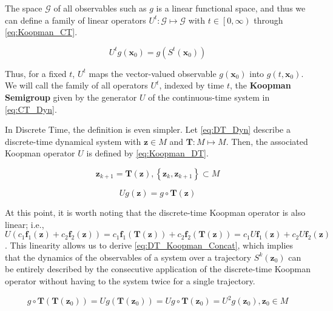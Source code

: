 \documentclass{article}
\begin{document}
    The space $\mathcal{G}$ of all observables such as $g$ is a linear functional space, and thus we can define a family of linear operators $U^t:\mathcal{G} \mapsto \mathcal{G}$ with $t \in \left[0,\infty\right)$ through \cref{eq:Koopman_CT}.

    \begin{equation} \label{eq:Koopman_CT}
        U^t g\left(\mathbf{x}_0\right) = g \left(S^t \left(\mathbf{x}_0\right)\right)
    \end{equation}

    Thus, for a fixed $t$, $U^t$ maps the vector-valued observable $g(\mathbf{x}_0)$ into $g\left(t,\mathbf{x}_0\right)$. We will call the family of all operators $U^t$, indexed by time $t$, the \textbf{Koopman Semigroup} given by the generator $U$ of the continuous-time system in \cref{eq:CT_Dyn}.

    In Discrete Time, the definition is even simpler. Let \cref{eq:DT_Dyn} describe a discrete-time dynamical system with $\mathbf{z} \in M$ and $\mathbf{T}:M \mapsto M$. Then, the associated Koopman operator $U$ is defined by \cref{eq:Koopman_DT}.

    \begin{equation} \label{eq:DT_Dyn}
        \mathbf{z}_{k+1} = \mathbf{T}\left(\mathbf{z}\right) , \left\{\mathbf{z}_k,\mathbf{z}_{k+1}\right\} \subset M
    \end{equation}

    \begin{equation} \label{eq:Koopman_DT}
        U g\left(\mathbf{z}\right) = g \circ \mathbf{T} \left(\mathbf{z}\right)
    \end{equation}

    At this point, it is worth noting that the discrete-time Koopman operator is also linear; i.e., $U\left(c_1 \mathbf{f}_1\left(\mathbf{z}\right) + c_2 \mathbf{f}_2\left(\mathbf{z}\right)\right) =
    c_1 \mathbf{f}_1\left(\mathbf{T}\left(\mathbf{z}\right)\right) + c_2 \mathbf{f}_2\left(\mathbf{T}\left(\mathbf{z}\right)\right) =
    c_1 U\mathbf{f}_1\left(\mathbf{z}\right) + c_2 U\mathbf{f}_2\left(\mathbf{z}\right)$. This linearity allows us to derive \cref{eq:DT_Koopman_Concat}, which implies that the dynamics of the observables of a system over a trajectory $S^k\left(\mathbf{z}_0\right)$ can be entirely described by the consecutive application of the discrete-time Koopman operator without having to  the system twice for a single trajectory.

    \begin{equation} \label{eq:DT_Koopman_Concat}
        g \circ \mathbf{T}\left(\mathbf{T}\left(\mathbf{z}_0\right)\right) = U g\left(\mathbf{T}\left(\mathbf{z}_0\right)\right) = U g \circ \mathbf{T} \left(\mathbf{z}_0\right) = U^2 g\left(\mathbf{z}_0\right) , \mathbf{z}_0 \in M
    \end{equation}
    
\end{document}
